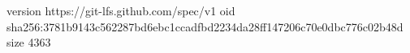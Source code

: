 version https://git-lfs.github.com/spec/v1
oid sha256:3781b9143c562287bd6ebc1ccadfbd2234da28ff147206c70e0dbc776c02b48d
size 4363

